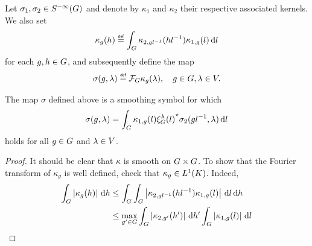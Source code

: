 \begin{lemma}
    Let $\sigma_1, \sigma_2 \in {S^{-\infty} (G)}$
    and denote by $\kappa_1$ and $\kappa_2$ their respective associated kernels.
    We also set
    \begin{align*}
        \kappa_g(h) \defeq \int_\Group \kappa_{2, g l^{-1}}(h l^{-1}) \kappa_{1, g}(l) \dd l
    \end{align*}
    for each $g, h \in G$,
    and subsequently define the map
    \begin{align*}
        \sigma(g, \lambda) \defeq \Fourier \kappa_g(\lambda),
        \quad g \in \Group, \lambda \in \VectorSpace.
    \end{align*}

    The map $\sigma$ defined above is a smoothing symbol for which
    \begin{align*}
        \sigma(g, \lambda) = \int_G \kappa_{1, g}(l) {\xi^{\lambda}_{G}(l)}^\star \sigma_2(g l^{-1}, \lambda) \,\mathrm{d} l
    \end{align*}
    holds for all $g \in G$ and $\lambda \in V$.
\end{lemma}
\begin{proof}
    It should be clear that $\kappa$ is smooth on $G \times G$.
    To show that the Fourier transform of $\kappa_g$ is well defined,
    check that $\kappa_g \in {L^{1} (K)}$.
    Indeed,
    \begin{align*}
        \int_G \left|{\kappa_g(h)}\right| \,\mathrm{d} h
        &\leq \int_G \int_G \left|{\kappa_{2, g l^{-1}}(h l^{-1}) \kappa_{1, g}(l)}\right| \,\mathrm{d} l \,\mathrm{d} h\\
        &\leq \max_{g' \in G} \int_G \left|{\kappa_{2, g'}(h')}\right| \,\mathrm{d} h'
        \int_G \left|{\kappa_{1, g}(l)}\right| \,\mathrm{d} l
    \end{align*}
\end{proof}

